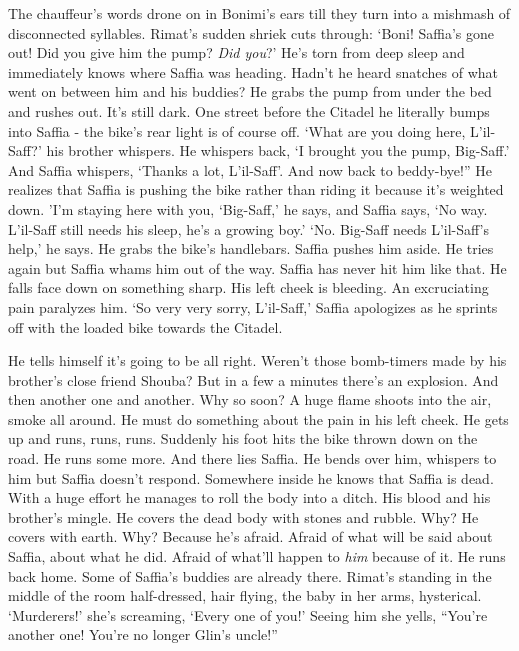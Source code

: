 \documentclass[twoside,11pt]{book}
\begin{document}
The chauffeur's words drone on in Bonimi's ears till they turn into a mishmash of disconnected syllables. Rimat's sudden
shriek cuts through: `Boni! Saffia's gone out! Did you give him the pump? \textit{Did you}?' He's torn from deep
sleep and immediately knows where Saffia was heading. Hadn't he heard snatches of what went on between him and his
buddies? He grabs the pump from under the bed and rushes out. It's still dark. One street before the Citadel he
literally bumps into Saffia - the bike's rear light is of course off. `What are you doing here, L'il-Saff?' his
brother whispers. He whispers back, `I brought you the pump, Big-Saff.' And Saffia whispers, `Thanks a lot, L'il-Saff'.
And now back to beddy-bye!'' He realizes that Saffia is pushing the bike rather than riding it because
it's weighted down. 'I'm staying here with you, `Big-Saff,' he says, and Saffia says, `No way. L'il-Saff still needs
his sleep, he's a growing boy.' `No. Big-Saff needs L'il-Saff's help,' he says. He grabs the bike's handlebars.
Saffia pushes him aside. He tries again but Saffia whams him out of the way. Saffia has never hit him like that. He
falls face down on something sharp. His left cheek is bleeding. An excruciating pain paralyzes
 him. `So very very sorry, L'il-Saff,' Saffia apologizes as he sprints off with the loaded bike towards the Citadel.

He tells himself it's going to be all right. Weren't those bomb-timers made by his brother's close friend Shouba? But
in a few a minutes there's an explosion. And then another one and another. Why so soon? A huge flame shoots into the
air, smoke all around. He must do something about the pain in his left cheek. He gets up and runs, runs, runs. Suddenly
his foot hits the bike thrown down on the road. He runs some more. And there lies Saffia. He bends over him, whispers
to him but Saffia doesn't respond. Somewhere inside he knows that Saffia is dead. With a huge effort he manages to roll
the body into a ditch. His blood and his brother's mingle. He covers the dead body with stones and
rubble. Why? He covers with earth. Why? Because he's afraid.  Afraid of what will be said about Saffia, about what he
did. Afraid of what'll happen to \textit{him} because of it. He runs back home. Some of Saffia's buddies are already
there. Rimat's standing in the middle of the room half-dressed, hair flying, the baby in her arms, hysterical.
`Murderers!' she's screaming, `Every one of you!' Seeing him she yells, ``You're another one! You're no
longer Glin's uncle!''
\end{document}
